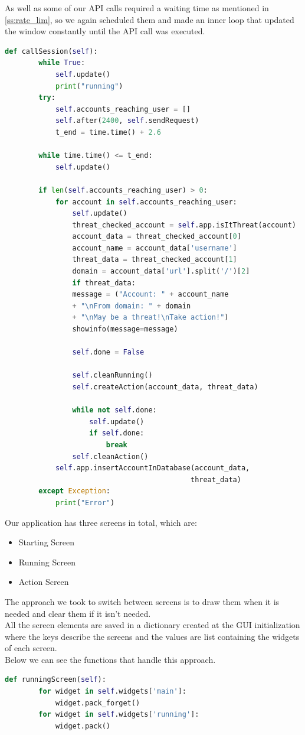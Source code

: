 As well as some of our API calls required a waiting time as mentioned in \ref{ss:rate_lim},
so we again scheduled them and made an inner loop that updated the window constantly until the API call was executed.
\\[5pt]
\begin{lstlisting}[language=python, caption={Updating the window while calling API functions}, captionpos=b]
	def callSession(self):
		while True:
			self.update()
			print("running")
		try:
			self.accounts_reaching_user = []
			self.after(2400, self.sendRequest)
			t_end = time.time() + 2.6
		
		while time.time() <= t_end:
			self.update()
		
		if len(self.accounts_reaching_user) > 0:
			for account in self.accounts_reaching_user:
				self.update()
				threat_checked_account = self.app.isItThreat(account)
				account_data = threat_checked_account[0]
				account_name = account_data['username']
				threat_data = threat_checked_account[1]
				domain = account_data['url'].split('/')[2]
				if threat_data:
				message = ("Account: " + account_name
				+ "\nFrom domain: " + domain 
				+ "\nMay be a threat!\nTake action!")
				showinfo(message=message)
		
				self.done = False
		
				self.cleanRunning() 
				self.createAction(account_data, threat_data)
		
				while not self.done:
					self.update()
					if self.done:
						break
				self.cleanAction()
			self.app.insertAccountInDatabase(account_data, 
											threat_data)
		except Exception:
			print("Error")
\end{lstlisting}
Our application has three screens in total, which are:
\begin{itemize}
	\item Starting Screen
	\item Running Screen
	\item Action Screen
\end{itemize}
The approach we took to switch between screens is to draw them when it is needed and
clear them if it isn't needed.
\\[5pt]
All the screen elements are saved in a dictionary created at the GUI initialization where the keys
describe the screens and the values are list containing the widgets of each screen.
\\[5pt]
Below we can see the functions that handle this approach.
\\[5pt]
\begin{lstlisting}[language=python, caption={Switching from starting screen to running screen}, captionpos=b]
	def runningScreen(self):
		for widget in self.widgets['main']:
			widget.pack_forget()
		for widget in self.widgets['running']:
			widget.pack()
\end{lstlisting}
